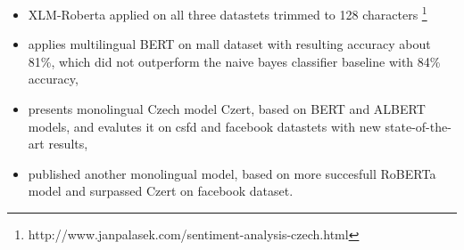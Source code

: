 \begin{itemize}
\item XLM-Roberta applied on all three datastets trimmed to 128 characters \footnote{http://www.janpalasek.com/sentiment-analysis-czech.html}
\item \citep{Klouda} applies multilingual BERT on mall dataset with resulting accuracy about  81\%, which did not outperform the naive bayes classifier baseline with 84\% accuracy, 
\item  \citep{Sido2021} presents monolingual Czech model Czert,  based on BERT and ALBERT models, and evalutes it on csfd and facebook datastets with new state-of-the-art results,
\item \citep{Straka2021} published another monolingual model, based on more succesfull RoBERTa model and surpassed Czert on facebook dataset.
\end{itemize}

